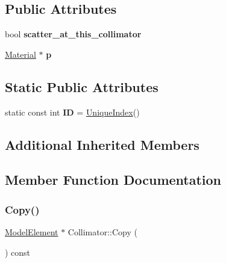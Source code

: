 \subsection*{Public Attributes}
\begin{DoxyCompactItemize}
\item 
\mbox{\label{classCollimator_afa138af5a4dc2f3bea288b00ab8daf6c}} 
bool {\bfseries scatter\+\_\+at\+\_\+this\+\_\+collimator}
\item 
\mbox{\label{classCollimator_ac4c4bda4b1e20e8b9a943c168bbaa18b}} 
\hyperlink{classMaterial}{Material} $\ast$ {\bfseries p}
\end{DoxyCompactItemize}
\subsection*{Static Public Attributes}
\begin{DoxyCompactItemize}
\item 
\mbox{\label{classCollimator_ac20290ce8e9880c343436e04166c05fb}} 
static const int {\bfseries ID} = \hyperlink{classAcceleratorComponent_aa7ad4d39e1a488b705983842ed1ac784}{Unique\+Index}()
\end{DoxyCompactItemize}
\subsection*{Additional Inherited Members}


\subsection{Member Function Documentation}
\mbox{\label{classCollimator_a82e63d47e1688d84f2e8f2fc3d247700}} 
\subsubsection{\texorpdfstring{Copy()}{Copy()}}
{\footnotesize\ttfamily \hyperlink{classModelElement}{Model\+Element} $\ast$ Collimator\+::\+Copy (\begin{DoxyParamCaption}{ }\end{DoxyParamCaption}) const\hspace{0.3cm}{\ttfamily [virtual]}}

